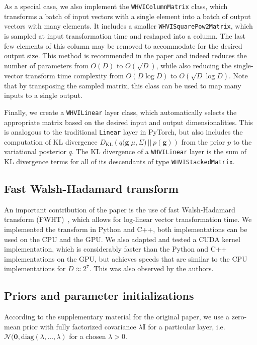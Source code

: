 As a special case, we also implement the \texttt{WHVIColumnMatrix} class, which transforms a batch of input vectors with a single element into a batch of output vectors with many elements.
It includes a smaller \texttt{WHVISquarePow2Matrix}, which is sampled at input transformation time and reshaped into a column.
The last few elements of this column may be removed to accommodate for the desired output size.
This method is recommended in the paper and indeed reduces the number of parameters from $O(D)$ to $O(\sqrt{D})$, while also reducing the single-vector transform time complexity from $O(D\log D)$ to $O(\sqrt{D}\log D)$.
Note that by transposing the sampled matrix, this class can be used to map many inputs to a single output.

Finally, we create a \texttt{WHVILinear} layer class, which automatically selects the appropriate matrix based on the desired input and output dimensionalities.
This is analogous to the traditional \texttt{Linear} layer in PyTorch, but also includes the computation of KL divergence $D_\mathrm{KL}\left(q(\mathbf{g}|\mu, \Sigma)\, ||\, p(\mathbf{g})\right)$ from the prior $p$ to the variational posterior $q$.
The KL divergence of a \texttt{WHVILinear} layer is the sum of KL divergence terms for all of its descendants of type \texttt{WHVIStackedMatrix}.

\subsection{Fast Walsh-Hadamard transform}\label{subsec:fast-walsh-hadamard-transform}
An important contribution of the paper is the use of fast Walsh-Hadamard transform (FWHT)~\cite{fino1976unified}, which allows for log-linear vector transformation time.
We implemented the transform in Python and C++, both implementations can be used on the CPU and the GPU\@.
We also adapted and tested a CUDA kernel implementation, which is considerably faster than the Python and C++ implementations on the GPU, but achieves speeds that are similar to the CPU implementations for $D \approx 2^7$.
This was also observed by the authors.


\subsection{Priors and parameter initializations}\label{subsec:priors-and-parameter-initializations}
According to the supplementary material for the original paper, we use a zero-mean prior with fully factorized covariance $\lambda \mathbf{I}$ for a particular layer, i.e. $\mathcal{N}(\mathbf{0}, \mathrm{diag}(\lambda, \dots, \lambda)$ for a chosen $\lambda > 0$.


